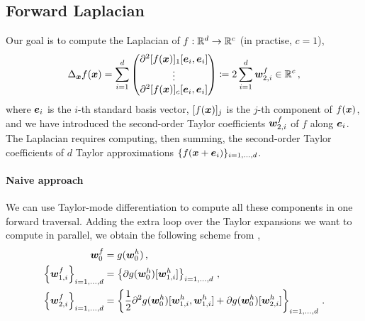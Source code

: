 \subsection{Forward Laplacian}
Our goal is to compute the Laplacian of $f: {\mathbb{R}}^d \to {\mathbb{R}}^c$ (in practise, $c=1$),
\begin{align}
  \Delta_{{\bm{x}}} f({\bm{x}})
  =
  \sum_{i=1}^d
  \begin{pmatrix}
    \partial^2[f({\bm{x}})]_1[{\bm{e}}_i, {\bm{e}}_i]
    \\
    \vdots
    \\
    \partial^2[f({\bm{x}})]_c[{\bm{e}}_i, {\bm{e}}_i]
  \end{pmatrix}
  \coloneq
  2 \sum_{i=1}^d {\bm{w}}_{2,i}^f \in {\mathbb{R}}^c\,,
\end{align}
where ${\bm{e}}_i$ is the $i$-th standard basis vector, $[f({\bm{x}})]_j$ is the $j$-th component of $f({\bm{x}})$, and we have introduced the second-order Taylor coefficients ${\bm{w}}_{2,i}^f$ of $f$ along ${\bm{e}}_i$.
The Laplacian requires computing, then summing, the second-order Taylor coefficients of $d$ Taylor approximations $\{f({\bm{x}} + {\bm{e}}_i)\}_{i=1,\dots, d}$.

\paragraph{Naive approach} We can use Taylor-mode differentiation to compute all these components in one forward traversal. Adding the extra loop over the Taylor expansions we want to compute in parallel, we obtain the following scheme from ,
\begin{subequations}\label{eq:taylor-mode-naive-laplacian}
  \begin{align}
    {\bm{w}}_0^f
    &=
      g({\bm{w}}_0^h)\,,
    \\
    \left\{
    {\bm{w}}_{1,i}^f
    \right\}_{i=1, \dots, d}
    &=
      \left\{
      \partial g({\bm{w}}_0^h)[{\bm{w}}_{1,i}^h]
      \right\}_{i=1, \dots, d}\,,
    \\ \label{eq:naive-laplacian-second-order-term}
    \left\{
    {\bm{w}}_{2,i}^f
    \right\}_{i=1, \dots, d}
    &=
      \left\{
      \frac{1}{2}
      \partial^2 g({\bm{w}}_0^h)[{\bm{w}}_{1,i}^h, {\bm{w}}_{1,i}^h]
      +
      \partial g({\bm{w}}_0^h)[{\bm{w}}_{2,i}^h]
      \right\}_{i=1, \dots, d}\,.
  \end{align}
\end{subequations}

